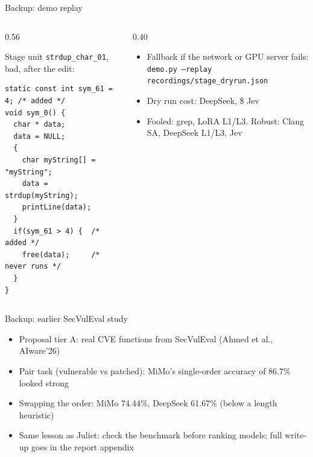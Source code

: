 \begin{frame}[fragile]{Backup: demo replay}
  \begin{columns}[T]
    \begin{column}{0.56\textwidth}
      {\small Stage unit \texttt{strdup\_char\_01}, bad, after the edit:\par}
\begin{lstlisting}[style=unit]
static const int sym_61 = 4; /* added */
void sym_0() {
  char * data;
  data = NULL;
  {
    char myString[] = "myString";
    data = strdup(myString);
    printLine(data);
  }
  if(sym_61 > 4) {  /* added */
    free(data);     /* never runs */
  }
}
\end{lstlisting}
    \end{column}
    \begin{column}{0.40\textwidth}
      \begin{itemize}\small
        \item Fallback if the network or GPU server fails:\\
              {\scriptsize\texttt{demo.py --replay}\\ \texttt{recordings/stage\_dryrun.json}}
        \item Dry run cost: \textyen{} DeepSeek, \$ Jev
        \item Fooled: grep, LoRA L1/L3. Robust: Clang SA, DeepSeek L1/L3, Jev
      \end{itemize}
    \end{column}
  \end{columns}
\end{frame}

\begin{frame}{Backup: earlier SecVulEval study}
  \begin{itemize}
    \item Proposal tier A: real CVE functions from SecVulEval (Ahmed et al., AIware'26)
    \item Pair task (vulnerable vs patched): MiMo's single-order accuracy of 86.7\% looked strong
    \item Swapping the order: MiMo 74.44\%, DeepSeek 61.67\% (below a length heuristic)
    \item Same lesson as Juliet: check the benchmark before ranking models; full write-up goes in the report appendix
  \end{itemize}
\end{frame}


